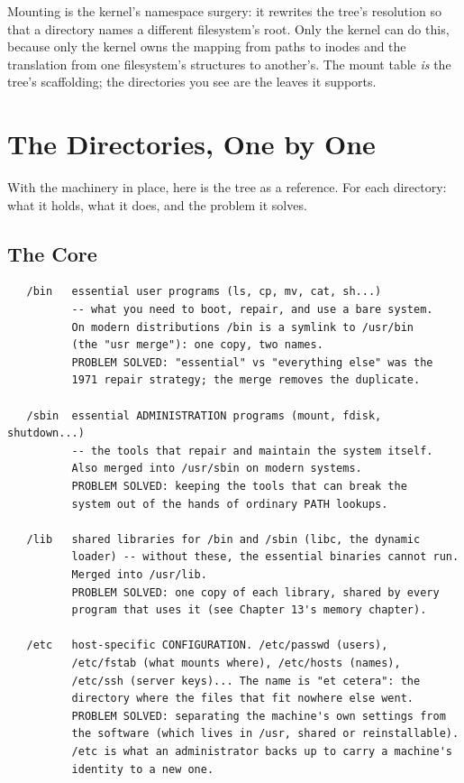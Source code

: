 \begin{osconcept}
Mounting is the kernel's namespace surgery: it rewrites the tree's
resolution so that a directory names a different filesystem's root.
Only the kernel can do this, because only the kernel owns the mapping
from paths to inodes and the translation from one filesystem's
structures to another's. The mount table \emph{is} the tree's
scaffolding; the directories you see are the leaves it supports.
\end{osconcept}

\section{The Directories, One by One}

With the machinery in place, here is the tree as a reference. For each
directory: what it holds, what it does, and the problem it solves.

\subsection{The Core}

\begin{verbatim}
   /bin   essential user programs (ls, cp, mv, cat, sh...)
          -- what you need to boot, repair, and use a bare system.
          On modern distributions /bin is a symlink to /usr/bin
          (the "usr merge"): one copy, two names.
          PROBLEM SOLVED: "essential" vs "everything else" was the
          1971 repair strategy; the merge removes the duplicate.

   /sbin  essential ADMINISTRATION programs (mount, fdisk, shutdown...)
          -- the tools that repair and maintain the system itself.
          Also merged into /usr/sbin on modern systems.
          PROBLEM SOLVED: keeping the tools that can break the
          system out of the hands of ordinary PATH lookups.

   /lib   shared libraries for /bin and /sbin (libc, the dynamic
          loader) -- without these, the essential binaries cannot run.
          Merged into /usr/lib.
          PROBLEM SOLVED: one copy of each library, shared by every
          program that uses it (see Chapter 13's memory chapter).

   /etc   host-specific CONFIGURATION. /etc/passwd (users),
          /etc/fstab (what mounts where), /etc/hosts (names),
          /etc/ssh (server keys)... The name is "et cetera": the
          directory where the files that fit nowhere else went.
          PROBLEM SOLVED: separating the machine's own settings from
          the software (which lives in /usr, shared or reinstallable).
          /etc is what an administrator backs up to carry a machine's
          identity to a new one.
\end{verbatim}

